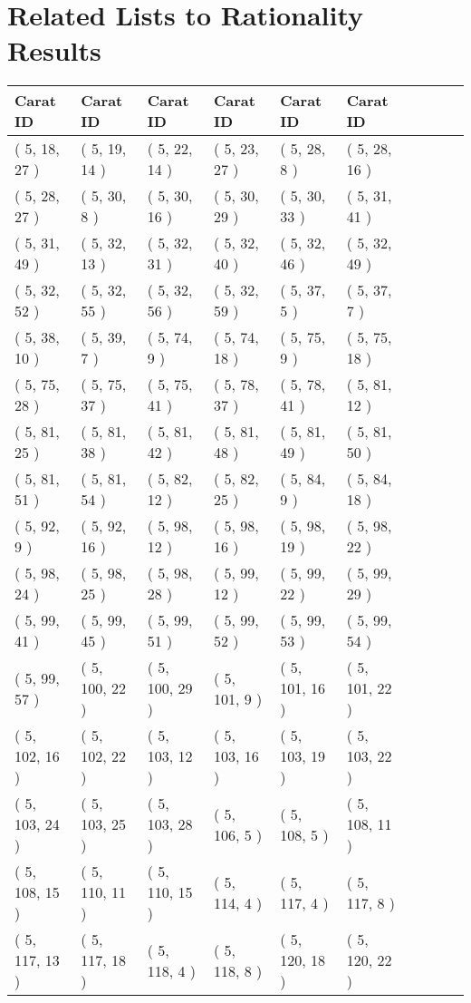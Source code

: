 \chapter{Related Lists to Rationality Results}\label{AppC}

\begin{longtable}{llllllllll}
\centering
Carat ID & Carat ID & Carat ID & Carat ID & Carat ID & Carat ID \\
\hline 
 ( 5, 18, 27 ) & ( 5, 19, 14 ) & ( 5, 22, 14 ) & ( 5, 23, 27 ) & ( 5, 28, 8 ) & ( 5, 28, 16 ) \\
  ( 5, 28, 27 ) & ( 5, 30, 8 ) & ( 5, 30, 16 ) & ( 5, 30, 29 )&  ( 5, 30, 33 ) & ( 5, 31, 41 ) \\
   ( 5, 31, 49 ) & ( 5, 32, 13 ) & ( 5, 32, 31 ) & ( 5, 32, 40 ) & ( 5, 32, 46 ) & ( 5, 32, 49 ) \\
    ( 5, 32, 52 ) & ( 5, 32, 55 )&  ( 5, 32, 56 ) & ( 5, 32, 59 ) & ( 5, 37, 5 ) & ( 5, 37, 7 ) \\
   ( 5, 38, 10 ) & ( 5, 39, 7 ) & ( 5, 74, 9 ) & ( 5, 74, 18 ) & ( 5, 75, 9 ) & ( 5, 75, 18 )\\
   ( 5, 75, 28 ) & ( 5, 75, 37 ) & ( 5, 75, 41 ) & ( 5, 78, 37 ) & ( 5, 78, 41 ) & ( 5, 81, 12 ) \\
   ( 5, 81, 25 ) & ( 5, 81, 38 ) & ( 5, 81, 42 ) & ( 5, 81, 48 )&  ( 5, 81, 49 ) & ( 5, 81, 50 ) \\
   ( 5, 81, 51 ) & ( 5, 81, 54 ) & ( 5, 82, 12 ) & ( 5, 82, 25 ) & ( 5, 84, 9 ) & ( 5, 84, 18 ) \\
    ( 5, 92, 9 ) & ( 5, 92, 16 )&  ( 5, 98, 12 ) & ( 5, 98, 16 ) & ( 5, 98, 19 ) & ( 5, 98, 22 ) \\
   ( 5, 98, 24 ) & ( 5, 98, 25 ) & ( 5, 98, 28 ) & ( 5, 99, 12 ) & ( 5, 99, 22 ) & ( 5, 99, 29 )\\
   ( 5, 99, 41 ) & ( 5, 99, 45 ) & ( 5, 99, 51 ) & ( 5, 99, 52 ) & ( 5, 99, 53 ) & ( 5, 99, 54 ) \\
   ( 5, 99, 57 ) & ( 5, 100, 22 ) & ( 5, 100, 29 ) & ( 5, 101, 9 ) &  ( 5, 101, 16 ) & ( 5, 101, 22 ) \\
    ( 5, 102, 16 ) & ( 5, 102, 22 ) & ( 5, 103, 12 ) & ( 5, 103, 16 ) & ( 5, 103, 19 ) & ( 5, 103, 22 ) \\
    ( 5, 103, 24 ) &  ( 5, 103, 25 ) & ( 5, 103, 28 ) & ( 5, 106, 5 ) & ( 5, 108, 5 ) & ( 5, 108, 11 ) \\
     ( 5, 108, 15 ) & ( 5, 110, 11 ) & ( 5, 110, 15 ) & ( 5, 114, 4 )&  ( 5, 117, 4 ) & ( 5, 117, 8 ) \\
     ( 5, 117, 13 ) & ( 5, 117, 18 ) & ( 5, 118, 4 ) & ( 5, 118, 8 ) & ( 5, 120, 18 ) & ( 5, 120, 22 ) \\

\end{longtable}

